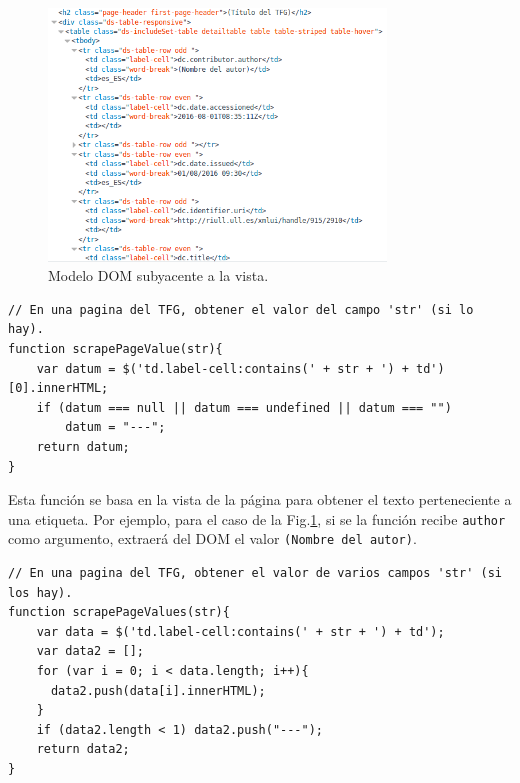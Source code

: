 \begin{center}
\begin{figure}[!ht]
  \caption{Modelo DOM subyacente a la vista.}
  \label{fig:metadata-view}
  \centering
    \includegraphics[width=0.8\textwidth]{Images/metadata_html}
\end{figure}
\end{center}

\begin{center}
\begin{minipage}{\linewidth}
\begin{lstlisting}[caption=Función de obtención de metadato por nombre de etiqueta.]
// En una pagina del TFG, obtener el valor del campo 'str' (si lo hay).
function scrapePageValue(str){
    var datum = $('td.label-cell:contains(' + str + ') + td')[0].innerHTML;
    if (datum === null || datum === undefined || datum === "")
        datum = "---";
    return datum;
}
\end{lstlisting}
\end{minipage}
\end{center}

Esta función se basa en la vista de la página para obtener el texto perteneciente a una etiqueta. Por ejemplo, para el caso de la Fig.\ref{fig:metadata-view}, si se la función recibe \texttt{author} como argumento, extraerá del DOM el valor \texttt{(Nombre del autor)}.


\begin{center}
\begin{minipage}{\linewidth}
\begin{lstlisting}[caption=Función de obtención de metadatos por nombre de etiqueta similar.]
// En una pagina del TFG, obtener el valor de varios campos 'str' (si los hay).
function scrapePageValues(str){
    var data = $('td.label-cell:contains(' + str + ') + td');
    var data2 = [];
    for (var i = 0; i < data.length; i++){
      data2.push(data[i].innerHTML);
    }
    if (data2.length < 1) data2.push("---");
    return data2;
}
\end{lstlisting}
\end{minipage}
\end{center}

